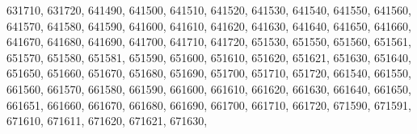 \textquotesingle{}631710\textquotesingle{}, \textquotesingle{}631720\textquotesingle{}, \textquotesingle{}641490\textquotesingle{}, \textquotesingle{}641500\textquotesingle{}, \textquotesingle{}641510\textquotesingle{}, \textquotesingle{}641520\textquotesingle{}, \textquotesingle{}641530\textquotesingle{}, \textquotesingle{}641540\textquotesingle{}, \textquotesingle{}641550\textquotesingle{}, \textquotesingle{}641560\textquotesingle{}, \textquotesingle{}641570\textquotesingle{}, \textquotesingle{}641580\textquotesingle{}, \textquotesingle{}641590\textquotesingle{}, \textquotesingle{}641600\textquotesingle{}, \textquotesingle{}641610\textquotesingle{}, \textquotesingle{}641620\textquotesingle{}, \textquotesingle{}641630\textquotesingle{}, \textquotesingle{}641640\textquotesingle{}, \textquotesingle{}641650\textquotesingle{}, \textquotesingle{}641660\textquotesingle{}, \textquotesingle{}641670\textquotesingle{}, \textquotesingle{}641680\textquotesingle{}, \textquotesingle{}641690\textquotesingle{}, \textquotesingle{}641700\textquotesingle{}, \textquotesingle{}641710\textquotesingle{}, \textquotesingle{}641720\textquotesingle{}, \textquotesingle{}651530\textquotesingle{}, \textquotesingle{}651550\textquotesingle{}, \textquotesingle{}651560\textquotesingle{}, \textquotesingle{}651561\textquotesingle{}, \textquotesingle{}651570\textquotesingle{}, \textquotesingle{}651580\textquotesingle{}, \textquotesingle{}651581\textquotesingle{}, \textquotesingle{}651590\textquotesingle{}, \textquotesingle{}651600\textquotesingle{}, \textquotesingle{}651610\textquotesingle{}, \textquotesingle{}651620\textquotesingle{}, \textquotesingle{}651621\textquotesingle{}, \textquotesingle{}651630\textquotesingle{}, \textquotesingle{}651640\textquotesingle{}, \textquotesingle{}651650\textquotesingle{}, \textquotesingle{}651660\textquotesingle{}, \textquotesingle{}651670\textquotesingle{}, \textquotesingle{}651680\textquotesingle{}, \textquotesingle{}651690\textquotesingle{}, \textquotesingle{}651700\textquotesingle{}, \textquotesingle{}651710\textquotesingle{}, \textquotesingle{}651720\textquotesingle{}, \textquotesingle{}661540\textquotesingle{}, \textquotesingle{}661550\textquotesingle{}, \textquotesingle{}661560\textquotesingle{}, \textquotesingle{}661570\textquotesingle{}, \textquotesingle{}661580\textquotesingle{}, \textquotesingle{}661590\textquotesingle{}, \textquotesingle{}661600\textquotesingle{}, \textquotesingle{}661610\textquotesingle{}, \textquotesingle{}661620\textquotesingle{}, \textquotesingle{}661630\textquotesingle{}, \textquotesingle{}661640\textquotesingle{}, \textquotesingle{}661650\textquotesingle{}, \textquotesingle{}661651\textquotesingle{}, \textquotesingle{}661660\textquotesingle{}, \textquotesingle{}661670\textquotesingle{}, \textquotesingle{}661680\textquotesingle{}, \textquotesingle{}661690\textquotesingle{}, \textquotesingle{}661700\textquotesingle{}, \textquotesingle{}661710\textquotesingle{}, \textquotesingle{}661720\textquotesingle{}, \textquotesingle{}671590\textquotesingle{}, \textquotesingle{}671591\textquotesingle{}, \textquotesingle{}671610\textquotesingle{}, \textquotesingle{}671611\textquotesingle{}, \textquotesingle{}671620\textquotesingle{}, \textquotesingle{}671621\textquotesingle{}, \textquotesingle{}671630\textquotesingle{}, 